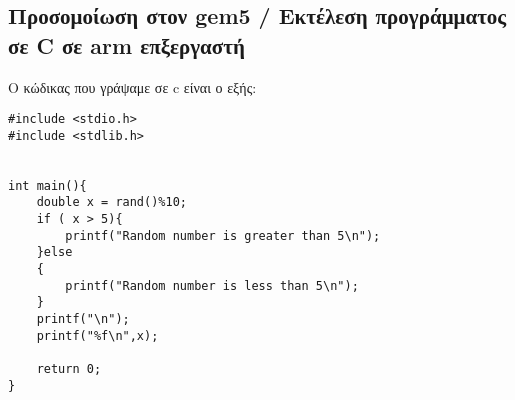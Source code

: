 \documentclass[10pt]{report}
\begin{document}

\subsection{Προσομοίωση στον gem5 / Εκτέλεση προγράμματος σε C σε arm επξεργαστή}
O κώδικας που γράψαμε σε c είναι ο εξής:\newline
\begin{lstlisting}
#include <stdio.h>
#include <stdlib.h>


int main(){
    double x = rand()%10;
    if ( x > 5){
        printf("Random number is greater than 5\n");
    }else
    {
        printf("Random number is less than 5\n");
    }
    printf("\n");
    printf("%f\n",x);
    
    return 0;
}
\end{lstlisting}
\end{document}
